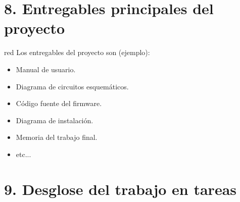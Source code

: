 \documentclass[
    11pt, %
]{charter}
\begin{document}
    \section{8. Entregables principales del proyecto}
    \label{sec:entregables}

    \begin{consigna}{red}
        Los entregables del proyecto son (ejemplo):

        \begin{itemize}
            \item Manual de usuario.
            \item Diagrama de circuitos esquemáticos.
            \item Código fuente del firmware.
            \item Diagrama de instalación.
            \item Memoria del trabajo final.
            \item etc...
        \end{itemize}
    \end{consigna}


    \section{9. Desglose del trabajo en tareas}
    \label{sec:wbs}
\end{document}
